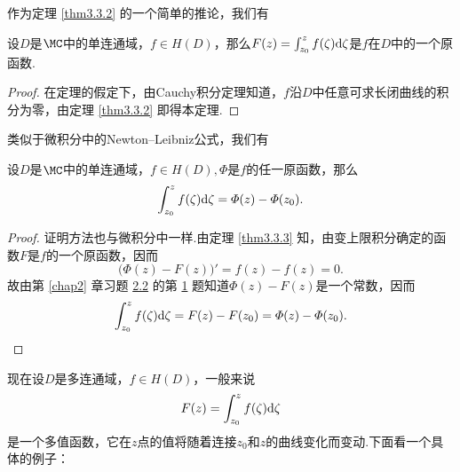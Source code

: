 作为定理 \ref{thm3.3.2} 的一个简单的推论，我们有
\begin{theorem}\label{thm3.3.3}
设$D$是$\MC$中的单连通域，$f\in H(D)$，那么$F(z)=\int_{z_0}^zf(\zeta)\textrm d\zeta$是$f$在$D$中的一个原函数.
\end{theorem}
\begin{proof}
在定理的假定下，由Cauchy积分定理知道，$f$沿$D$中任意可求长闭曲线的积分为零，由定理 \ref{thm3.3.2} 即得本定理.
\end{proof}

类似于微积分中的Newton--Leibniz公式，我们有
\begin{theorem}\label{thm3.3.4}
设$D$是$\MC$中的单连通域，$f\in H(D),\varPhi$是$f$的任一原函数，那么
\[\int_{z_0}^zf(\zeta)\textrm d\zeta=\varPhi(z)-\varPhi(z_0).\]
\end{theorem}
\begin{proof}
证明方法也与微积分中一样.由定理 \ref{thm3.3.3} 知，由变上限积分确定的函数$F$是$f$的一个原函数，因而
\[\big(\varPhi(z)-F(z)\big)'=f(z)-f(z)=0.\]
故由第 \ref{chap2} 章习题 \hyperlink{xiti2.2}{2.2} 的第 \hyperlink{xiti2.2.1}{1} 题知道$\varPhi(z)-F(z)$是一个常数，因而
\begin{equation*}
\int_{z_0}^zf(\zeta)\textrm d\zeta=F(z)-F(z_0)=\varPhi(z)-\varPhi(z_0).
\end{equation*}
\end{proof}

现在设$D$是多连通域，$f\in H(D)$，一般来说
\[F(z)=\int_{z_0}^zf(\zeta)\textrm d\zeta\]
是一个多值函数，它在$z$点的值将随着连接$z_0$和$z$的曲线变化而变动.下面看一个具体的例子：

